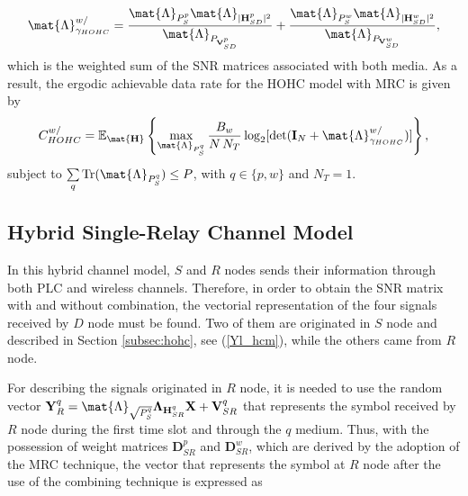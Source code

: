 \begin{equation}
	\mat{\Lambda}_{\gamma_{HOHC}}^{w/} = \frac{\mat{\Lambda}_{P_{S}^{p}} \mat{\Lambda}_{|\mathbf{H}_{SD}^p|^2}} {\mat{\Lambda}_{P_{\mathbf{V}_{SD}^p}}} + \frac{\mat{\Lambda}_{P_{S}^{w}} \mat{\Lambda}_{|\mathbf{H}_{SD}^w|^2}} { \mat{\Lambda}_{P_{\mathbf{V}_{SD}^w}}},
\end{equation}
which is the weighted sum of the \ac{SNR} matrices associated with both media. As a result, the ergodic achievable data rate for the \ac{HOHC} model with \ac{MRC} is given by
\begin{equation}
	C_{HOHC}^{w/} = \mathbb{E}_{ \mat{\mathbf{H}}} \left\{\max_{\mat{\Lambda}_{P_{S}^{q}}} \dfrac{B_{w}}{N \, N_{T}} \log_{2} [\text{det}(\mathbf{I}_{N}+ \mat{\Lambda}_{\gamma_{HOHC}}^{w/} )]\right\},
\end{equation}
subject to $ \sum\limits_{q} \text{Tr}(\mat{\Lambda}_{P_{S}^{q}}) \leq P $, with $q \in \{p,w\}$ and $ N_{T} = 1 $.

\subsection{\textbf{Hybrid Single-Relay Channel Model}}\label{subsec:hsrc}

In this hybrid channel model, $S$ and $R$ nodes sends their information through both \ac{PLC} and wireless channels. Therefore, in order to obtain the \ac{SNR} matrix with and without combination, the vectorial representation of the four signals received by $D$ node must be found. Two of them are originated in $S$ node and described in Section \ref{subsec:hohc}, see (\ref{Yl_hcm}), while the others came from $R$ node. 

For describing the signals originated in $R$ node, it is needed to use the random vector $ \mathbf{Y}_{R}^q = \mat{\Lambda}_{\sqrt{P_{S}^q}} \mathbf{\Lambda}_{\mathbf{H}_{SR}^q} \mathbf{X} + \mathbf{V}_{SR}^q $ that represents the symbol received by $R$ node during the first time slot and through the $q$ medium. Thus, with the possession of weight matrices $ \mathbf{D}_{SR}^{p} $ and $ \mathbf{D}_{SR}^{w} $, which are derived by the adoption of the \ac{MRC} technique, the vector that represents the symbol at $R$ node after the use of the combining technique is expressed as

